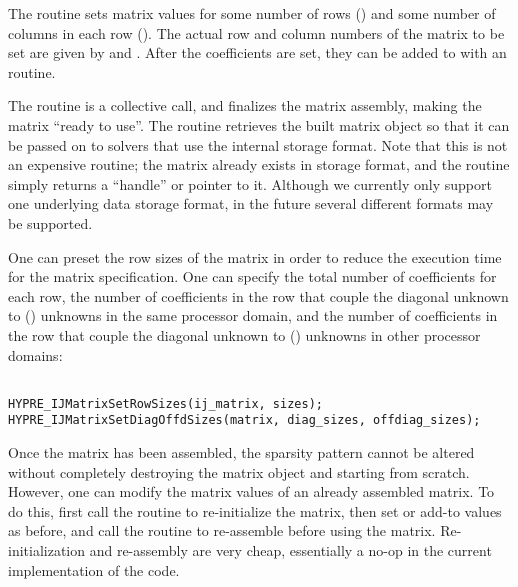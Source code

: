 The  routine sets matrix values for some number of
rows () and some number of columns in each row
().  The actual row and column numbers of the matrix
 to be set are given by  and .
After the coefficients are set, they can be added to with an
 routine.  

The  routine is a collective call, and finalizes the
matrix assembly, making the matrix ``ready to use''.  The
 routine retrieves the built matrix object so that
it can be passed on to \hypre{} solvers that use the 
internal storage format.  Note that this is not an expensive routine;
the matrix already exists in  storage format, and the
routine simply returns a ``handle'' or pointer to it.  Although we
currently only support one underlying data storage format, in the
future several different formats may be supported.

One can preset the row sizes of the matrix in order to reduce the
execution time for the matrix specification.  One can specify the
total number of coefficients for each row, the number of coefficients
in the row that couple the diagonal unknown to () unknowns
in the same processor domain, and the number of coefficients in the
row that couple the diagonal unknown to () unknowns in
other processor domains:

\begin{display}
\begin{verbatim}

HYPRE_IJMatrixSetRowSizes(ij_matrix, sizes);
HYPRE_IJMatrixSetDiagOffdSizes(matrix, diag_sizes, offdiag_sizes);

\end{verbatim}
\end{display}

Once the matrix has been assembled, the sparsity pattern cannot be
altered without completely destroying the matrix object and starting
from scratch.  However, one can modify the matrix values of an already
assembled matrix.  To do this, first call the 
routine to re-initialize the matrix, then set or add-to values as
before, and call the  routine to re-assemble before
using the matrix.  Re-initialization and re-assembly are very cheap,
essentially a no-op in the current implementation of the code.


